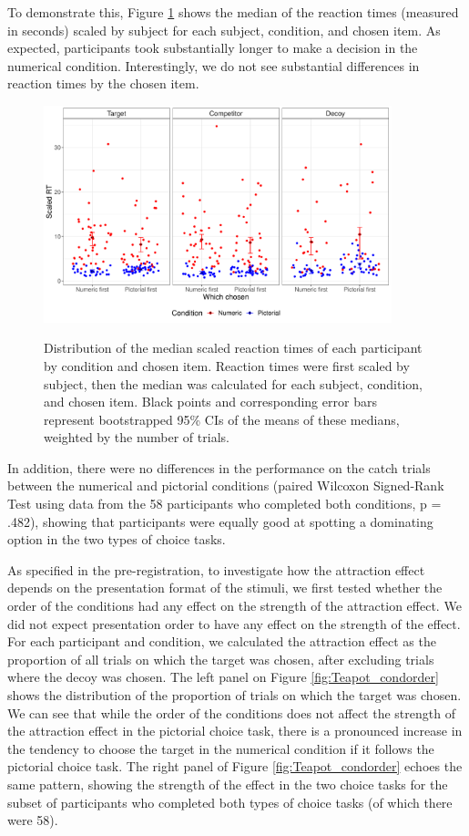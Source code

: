 \documentclass[11pt,a4paper]{article}
\begin{document}
 To demonstrate this, Figure \ref{fig:Teapot_rts} shows the median of the reaction times (measured in seconds) scaled by subject for each subject, condition, and chosen item. As expected, participants took substantially longer to make a decision in the numerical condition. Interestingly, we do not see substantial differences in reaction times by the chosen item.

 \begin{figure}[htp]
\centering
\captionsetup{justification=centering,margin=2cm}
\caption{Distribution of the median scaled reaction times of each participant by condition and chosen item. Reaction times were first scaled by subject, then the median was calculated for each subject, condition, and chosen item. Black points and corresponding error bars represent bootstrapped 95\% CIs of the means of these medians, weighted by the number of trials.}
\includegraphics[width=0.9\textwidth]{./Teapot_rts.pdf}
\label{fig:Teapot_rts}
\end{figure} 


 In addition, there were no differences in the performance on the catch trials between the numerical and pictorial conditions (paired Wilcoxon Signed-Rank Test using data from the 58 participants who completed both conditions, p = .482), showing that participants were equally good at spotting a dominating option in the two types of choice tasks.

As specified in the pre-registration, to investigate how the attraction effect depends on the presentation format of the stimuli, we first tested whether the order of the conditions had any effect on the strength of the attraction effect. We did not expect presentation order to have any effect on the strength of the effect. For each participant and condition, we calculated the attraction effect as the proportion of all trials on which the target was chosen, after excluding trials where the decoy was chosen. The left panel on Figure \ref{fig:Teapot_condorder} shows the distribution of the proportion of trials on which the target was chosen. We can see that while the order of the conditions does not affect the strength of the attraction effect in the pictorial choice task, there is a pronounced increase in the tendency to choose the target in the numerical condition if it follows the pictorial choice task. The right panel of Figure \ref{fig:Teapot_condorder} echoes the same pattern, showing the strength of the effect in the two choice tasks for the subset of participants who completed both types of choice tasks (of which there were 58).   
\end{document}
